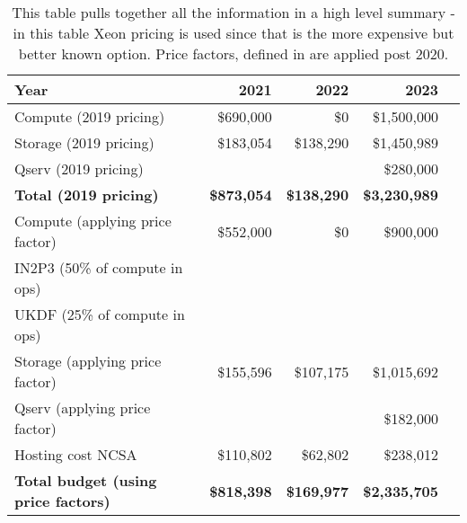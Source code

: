 \tiny \begin{longtable} { |p{}  |r  |r  |r  |r |} 
\caption{This table pulls together all the information in a high level summary - in this table Xeon pricing is used since that is the more expensive but better known option. Price factors, defined in  are applied post 2020.
 \label{tab:Summary}}\\ 
\hline 
\textbf{Year}&\textbf{2021}&\textbf{2022}&\textbf{2023} \\ \hline
{Compute (2019 pricing)}&{\$690,000}&{\$0}&{\$1,500,000} \\ \hline
{Storage (2019 pricing)}&{\$183,054}&{\$138,290}&{\$1,450,989} \\ \hline
{Qserv (2019 pricing)}&{}&{}&{\$280,000} \\ \hline
\textbf{Total (2019 pricing)}&\textbf{\$873,054}&\textbf{\$138,290}&\textbf{\$3,230,989} \\ \hline
{Compute (applying price factor)}&{\$552,000}&{\$0}&{\$900,000} \\ \hline
{IN2P3 (50\% of compute in ops)}&{}&{}&{} \\ \hline
{UKDF (25\% of compute in ops)}&{}&{}&{} \\ \hline
{Storage (applying price factor)}&{\$155,596}&{\$107,175}&{\$1,015,692} \\ \hline
{Qserv (applying price factor)}&{}&{}&{\$182,000} \\ \hline
{Hosting cost NCSA
}&{\$110,802}&{\$62,802}&{\$238,012} \\ \hline
\textbf{Total budget (using price factors)}&\textbf{\$818,398}&\textbf{\$169,977}&\textbf{\$2,335,705} \\ \hline
\end{longtable} \normalsize
